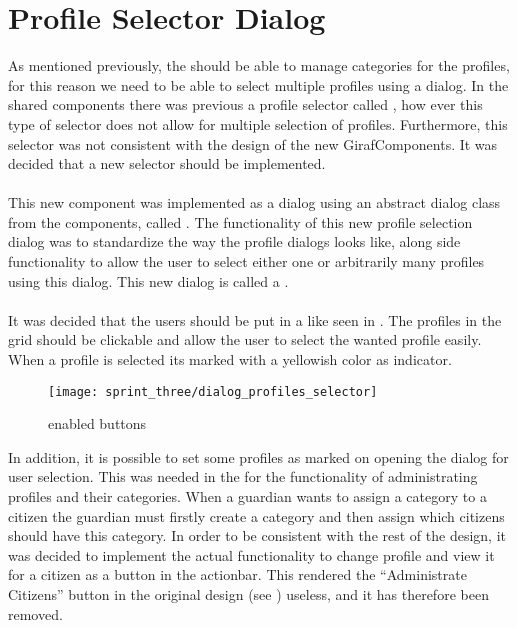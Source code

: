 
\section{Profile Selector Dialog}
\label{sec:profile_selector_dialog}

As mentioned previously, the \ct should be able to manage categories for the profiles, for this reason we need to be able to select multiple profiles using a dialog. In the shared components there was previous a profile selector called , how ever this type of selector does not allow for multiple selection of profiles. Furthermore, this selector was not consistent with the design of the new GirafComponents. It was decided that a new selector should be implemented.
\\\\
This new component was implemented as a dialog using an abstract dialog class from the components, called . The functionality of this new profile selection dialog was to standardize the way the profile dialogs looks like, along side functionality to allow the user to select either one or arbitrarily many profiles using this dialog. This new dialog is called a .
\\\\
It was decided that the users should be put in a  like seen in . The profiles in the grid should be clickable and allow the user to select the wanted profile easily. When a profile is selected its marked with a yellowish color as indicator.

\begin{figure}[!htbp]
        \centering
        \texttt{[image: sprint\_three/dialog\_profiles\_selector]}
        \caption{\ct enabled buttons}
        \label{fig:dialog_profiles_selector}
\end{figure}

In addition, it is possible to set some profiles as marked on opening the dialog for user selection. This was needed in the \ct for the functionality of administrating profiles and their categories. When a guardian wants to assign a category to a citizen the guardian must firstly create a category and then assign which citizens should have this category. In order to be consistent with the rest of the design, it was decided to implement the actual functionality to change profile and view it for a citizen as a button in the actionbar. This rendered the ``Administrate Citizens'' button in the original design (see ) useless, and it has therefore been removed. 